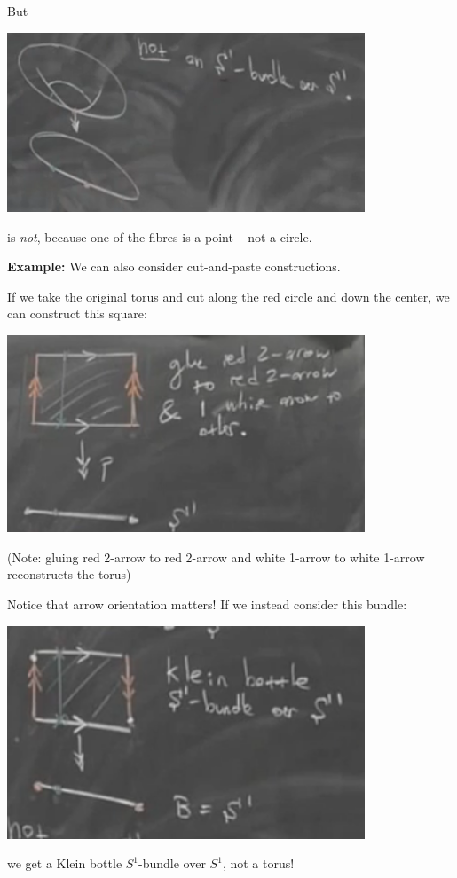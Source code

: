 \documentclass[12pt]{article}
\begin{document}
    But 
    \begin{center}
        \includegraphics[width=0.8\textwidth]{Images/April 16 - Deformed torus bundle.png}
    \end{center}
    is \emph{not}, because one of the fibres is a point -- not a circle. 

    \textbf{Example:} We can also consider cut-and-paste constructions. 

    If we take the original torus and cut along the red circle and down the center, we can construct this square: 
    \begin{center}
        \includegraphics[width=0.8\textwidth]{Images/April 16 - Torus square.png}
    \end{center}
    (Note: gluing red 2-arrow to red 2-arrow and white 1-arrow to white 1-arrow reconstructs the torus)

    Notice that arrow orientation matters! If we instead consider this bundle: 
    \begin{center}
        \includegraphics[width=0.8\textwidth]{Images/April 16 - Klein square.png}
    \end{center}
    we get a Klein bottle $S^1$-bundle over $S^1$, not a torus! 
\end{document}
